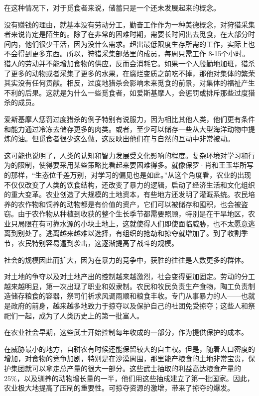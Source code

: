 在这种情况下，对于觅食者来说，储蓄只是一个还未发展起来的概念。

没有赚钱的理由，就基本没有劳动分工，勤奋工作作为一种美德概念，对狩猎采集者来说肯定是陌生的。除了在非常的困难时期，需要长时间出去觅食，在大部分时间内，他们很少干活，因为没什么需求。超出最低限度生存所需的工作，实际上也不会得到更多东西。所以，狩猎采集部落里的成员，每周只需工作 8-15个小时。猎人的劳动并不能增加食物的供应，反而会消耗它。如果一个人殷勤地加班，猎杀了更多的动物或者采集了更多的水果，在腐烂变质之前吃不掉，那他对集体的繁荣其实没有任何贡献。相反，过度地猎杀会影响未来觅食的前景，对集体的福祉产生不利的后果。这就是为什么一些觅食者，如爱斯基摩人，会惩罚或排斥那些过度猎杀的成员。

爱斯基摩人惩罚过度猎杀的例子特别有说服力，因为相比其他人类，他们更有条件和能力通过冷冻去储存更多的肉类。或者，至少可以储存一些从大型海洋动物中提炼的油。但觅食者很少这么做，这反映出他们在与自然的互动中非常被动。

这可能也说明了，人类的认知和智力发展受文化影响的程度。复杂环境对学习和行为的限制，使得要采用某些策略比看起来要困难得多。就像保罗·肖和王玉华所写的那样，“生态位千差万别，对学习的偏见也是如此。”从这个角度看，农业的出现不仅仅改变了人类的饮食结构，还改变了暴力的逻辑，启动了经济生活和文化组织的重大变革。农业创造了大规模的土地资本，有些地方还发明了灌溉系统。农民培养的农作物和饲养的动物都是有价值的资产，它们可以被储存和囤积，也会被盗窃。由于农作物从种植到收获的整个生长季节都需要照顾，特别是在干旱地区，农业只局限在有可靠水源的小块土地上，这就使得人们即使面临威胁，也不太愿意逃离到别处了。逃离越来越难以选择，有组织的抢劫和掠夺就增加了。到了收割季节，农民特别容易遭到袭击，这逐渐提高了战斗的规模。

社会的规模因此而扩大，因为在暴力的竞争中，获胜的往往是人数更多的群体。

对土地的争夺以及对土地产出的控制越来越激烈，社会变得更加固定。劳动的分工越来越明显，第一次出现了职业和奴隶制。农民和牧民负责生产食物，陶工负责制造储存粮食的容器，祭司们祈求风调雨顺和粮食丰收。专门从事暴力的人——也就是政府的前身，越来越多地致力于掠夺以及保护自己的社团免受掠夺；这些人和祭祀们一起，成为了人类历史上的第一批富人。

在农业社会早期，这些武士开始控制每年收成的一部分，作为提供保护的成本。

在威胁最小的地方，自耕农有时候还能保留较大的自主权。但是，随着人口密度的增加，对食物的竞争加剧，特别是在沙漠周围，那里能产粮食的土地非常宝贵，保护集团就可以拿走总产量的很大一部分。这些武士抽取的利益高达粮食产量的25\%，以及驯养的动物增长量的一半，他们用这些抽成建立了第一批国家。因此，农业极大地提高了压制的重要性。可掠夺资源的激增，带来了掠夺的爆发。

